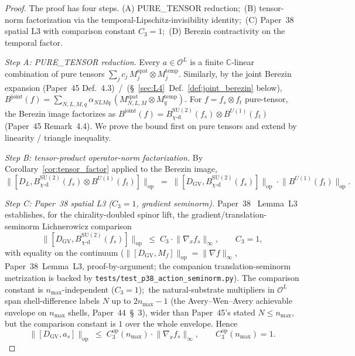 \documentclass[11pt,a4paper]{article}
\theoremstyle{plain}
\theoremstyle{definition}
\newcommand{\nmax}{n_{\max}}
\newcommand{\Op}{\mathcal{O}}
\newcommand{\opnorm}[1]{\lVert #1 \rVert_{\mathrm{op}}}
\newcommand{\norm}[1]{\lVert #1 \rVert}
\newcommand{\C}{\mathbb{C}}
\newcommand{\SU}{\mathrm{SU}}
\newcommand{\Uone}{U(1)}
\newcommand{\DGV}{D_{\mathrm{GV}}}
\newcommand{\DL}{D_{L}}
\newcommand{\Bjoint}{B^{\mathrm{joint}}}
\newcommand{\Cthreeop}{C_{3}^{\mathrm{op}}}
\newcommand{\spat}{\mathrm{spat}}
\newcommand{\temp}{\mathrm{temp}}
\newcommand{\chid}{\chi\text{-d}}
\begin{document}
\begin{proof}
The proof has four steps. (A) PURE\_TENSOR reduction;\ (B) tensor-norm
factorization via the temporal-Lipschitz-invisibility identity;\ (C)
Paper~38 spatial L3 with comparison constant $C_{3} = 1$;\ (D) Berezin
contractivity on the temporal factor.

\emph{Step A: PURE\_TENSOR reduction.}
Every $a \in \Op^{L}$ is a finite $\C$-linear combination of pure
tensors $\sum_{j} c_{j}\,M^{\spat}_{j} \otimes M^{\temp}_{j}$.
Similarly, by the joint Berezin expansion (Paper~45
Def.~4.3)~/~(\S~\ref{sec:L4}~Def.~\ref{def:joint_berezin} below),
$\Bjoint(f) = \sum_{N, L, M, q} \alpha_{N L M q}\,
(M^{\spat}_{N, L, M} \otimes M^{\temp}_{q})$. For
$f = f_{s} \otimes f_{t}$ pure-tensor, the Berezin image factorizes as
$\Bjoint(f) = B^{\SU(2)}_{\chid}(f_{s}) \otimes B^{\Uone}(f_{t})$
(Paper~45 Remark~4.4). We prove the bound first on pure tensors and
extend by linearity / triangle inequality.

\emph{Step B: tensor-product operator-norm factorization.}
By Corollary~\ref{cor:tensor_factor} applied to the Berezin image,
\begin{equation*}
   \opnorm{[\DL, B^{\SU(2)}_{\chid}(f_{s}) \otimes B^{\Uone}(f_{t})]}
   \;=\; \opnorm{[\DGV, B^{\SU(2)}_{\chid}(f_{s})]} \cdot \opnorm{B^{\Uone}(f_{t})}.
\end{equation*}

\emph{Step C: Paper~38 spatial L3 ($C_{3} = 1$, gradient seminorm).}
Paper~38~\cite{paper38} Lemma~L3 establishes, for the chirality-doubled
spinor lift, the gradient/translation-seminorm Lichnerowicz comparison
\begin{equation}\label{eq:C3_per_harmonic}
   \opnorm{[\DGV, B^{\SU(2)}_{\chid}(f_{s})]}
   \;\le\; C_{3} \cdot \norm{\nabla_{x} f_{s}}_{\infty}, \qquad C_{3} = 1,
\end{equation}
with equality on the continuum ($\opnorm{[\DGV, M_{f}]} =
\norm{\nabla f}_{\infty}$, Paper~38~Lemma~L3, proof-by-argument; the
companion translation-seminorm metrization is backed by
\texttt{tests/test\_p38\_action\_seminorm.py}). The comparison constant
is $\nmax$-independent ($C_{3} = 1$);\ the natural-substrate multipliers
in $\Op^{L}$ span shell-difference labels $N$ up to $2\nmax - 1$ (the
Avery--Wen--Avery achievable envelope on $\nmax$ shells, Paper~44~\S~3),
wider than Paper~45's stated $N \le \nmax$, but the comparison constant
is $1$ over the whole envelope. Hence
\begin{equation*}
   \opnorm{[\DGV, a_{s}]}
   \;\le\; \Cthreeop(\nmax) \cdot \norm{\nabla_{x} f_{s}}_{\infty},
   \qquad \Cthreeop(\nmax) = 1.
\end{equation*}


\end{proof}
\end{document}
